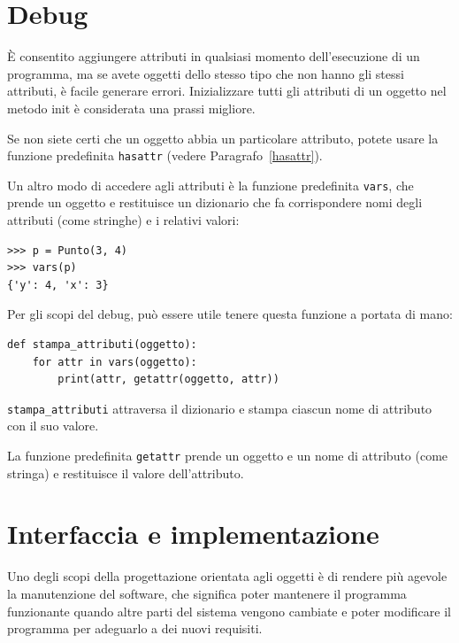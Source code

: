 \documentclass[10pt]{book}
\begin{document}
\section{Debug}

È consentito aggiungere attributi in qualsiasi momento dell'esecuzione di un programma, ma se avete oggetti dello stesso tipo che non hanno gli stessi attributi, è facile generare errori. Inizializzare tutti gli attributi di un oggetto nel metodo init è considerata una prassi migliore.

Se non siete certi che un oggetto abbia un particolare attributo, potete usare la funzione predefinita {\tt hasattr} (vedere Paragrafo~\ref{hasattr}).

Un altro modo di accedere agli attributi è la funzione predefinita {\tt vars}, che prende un oggetto e restituisce un dizionario che fa corrispondere nomi degli attributi (come stringhe) e i relativi valori:

\begin{verbatim}
>>> p = Punto(3, 4)
>>> vars(p)
{'y': 4, 'x': 3}
\end{verbatim}
%
Per gli scopi del debug, può essere utile tenere questa funzione a portata di mano:

\begin{verbatim}
def stampa_attributi(oggetto):
    for attr in vars(oggetto):
        print(attr, getattr(oggetto, attr))
\end{verbatim}
%
\verb"stampa_attributi" attraversa il dizionario e stampa ciascun nome di attributo con il suo valore.

La funzione predefinita {\tt getattr} prende un oggetto e un nome di attributo (come stringa) e restituisce il valore dell'attributo.


\section{Interfaccia e implementazione}

Uno degli scopi della progettazione orientata agli oggetti è di rendere più agevole la manutenzione del software, che significa poter mantenere il programma funzionante quando altre parti del sistema vengono cambiate e poter modificare il programma per adeguarlo a dei nuovi requisiti.
\end{document}
